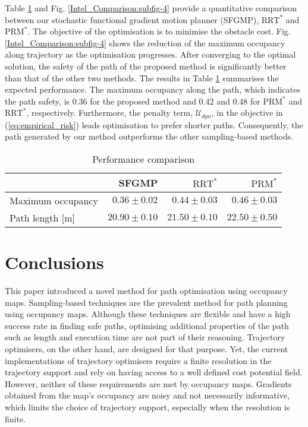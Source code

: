 \documentclass[letterpaper, 10 pt, conference]{ieeeconf}  %
\begin{document}
Table \ref{tab:performance_comparison} and Fig. \ref{Intel_Comparison:subfig-4} provide a quantitative comparison between our stochastic functional gradient motion planner (SFGMP), $\text{RRT}^*$ and $\text{PRM}^*$. The objective of the optimisation is to minimise the obstacle cost. Fig. \ref{Intel_Comparison:subfig-4} shows the reduction of the maximum occupancy along trajectory as the optimisation progresses. After converging to the optimal solution, the safety of the path of the proposed method is significantly better than that of the other two methods. The results in Table \ref{tab:performance_comparison} summarises the expected performance. The maximum occupancy along the path, which indicates the path safety, is 0.36 for the proposed method and 0.42 and 0.48 for  $\text{PRM}^*$ and $\text{RRT}^*$, respectively. 
Furthermore, the penalty term, $\mathcal{U}_{dyn}$, in the objective in (\ref{eq:empirical_risk}) leads optimisation to prefer shorter paths. Consequently, the path generated by our method outperforms the other sampling-based methods.  
 \begin{table}[thbp]
	\centering
	\caption{Performance comparison}
	\label{tab:performance_comparison}
	\begin{tabular}{lrrr}
		\toprule
		& SFGMP & $\text{RRT}^*$ \cite{karaman2010incremental} & $\text{PRM}^*$ \cite{Karaman2011} \\
		\midrule
		Maximum occupancy & $ 0.36 \pm 0.02$ & $ 0.44 \pm 0.03$ & $ 0.46 \pm 0.03$ \\
		Path length [m]   & $20.90 \pm 0.10$ & $21.50 \pm 0.10$ & $22.50 \pm 0.50$ \\
        \bottomrule
	\end{tabular}
\end{table}

\section{Conclusions}
\label{sec:conclusions}

This paper introduced a novel method for path optimisation using occupancy maps. Sampling-based techniques are the prevalent method for path planning using occupancy maps. Although these techniques are flexible and have a high success rate in finding safe paths, optimising additional properties of the path such as length and execution time are not part of their reasoning. Trajectory optimisers, on the other hand, are designed for that purpose. Yet, the current implementations of trajectory optimisers require a finite resolution in the trajectory support and rely on having access to a well defined cost potential field. However, neither of these requirements are met by occupancy maps. Gradients obtained from the map's occupancy are noisy and not necessarily informative, which limits the choice of trajectory support, especially when the resolution is finite.
\end{document}
